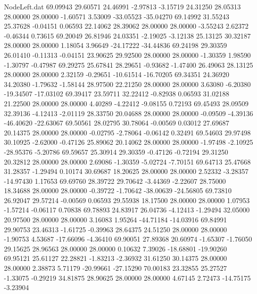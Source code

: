 \begin{filecontents}{NodeLeft.dat}
  69.09943   29.60571   24.46991    -2.97813   -3.15719   24.31250   28.05313   28.00000   28.00000   -1.60571    3.53009  -33.05523  -35.04270
  69.14992   31.55243   25.37628    -0.04151    0.06593   22.14062   28.39062   28.00000   28.00000   -3.55243    2.62372   -0.46344    0.73615
  69.20049   26.81946   24.03351    -2.19025   -3.12138   25.13125   30.32187   28.00000   28.00000    1.18054    3.96649  -24.17222  -34.44836
  69.24198   29.30359   26.01410    -0.11313   -0.04151   23.90625   29.92500   28.00000   28.00000   -1.30359    1.98590   -1.30797   -0.47987
  69.29275   25.67841   28.29651    -0.93682   -1.47400   26.49063   28.13125   28.00000   28.00000    2.32159   -0.29651  -10.61514  -16.70205
  69.34351   24.36920   34.20380    -1.79632   -1.58144   28.97500   22.21250   28.00000   28.00000    3.63080   -6.20380  -19.34507  -17.03102
  69.39417   23.59711   32.22412    -0.82938    0.06593   31.02188   21.22500   28.00000   28.00000    4.40289   -4.22412   -9.08155    0.72193
  69.45493   28.09509   32.39136    -4.12413   -2.01119   28.33750   20.04688   28.00000   28.00000   -0.09509   -4.39136  -46.40620  -22.63067
  69.50561   28.02795   30.78064    -0.00569    0.03012   27.69687   20.14375   28.00000   28.00000   -0.02795   -2.78064   -0.06142    0.32491
  69.54603   29.97498   30.10925    -2.62000   -0.47126   25.89062   20.14062   28.00000   28.00000   -1.97498   -2.10925  -28.95376   -5.20786
  69.59657   25.30914   29.30359    -0.47126   -0.72194   29.31250   20.32812   28.00000   28.00000    2.69086   -1.30359   -5.02724   -7.70151
  69.64713   25.47668   31.28357    -1.29494    0.10174   30.69687   18.20625   28.00000   28.00000    2.52332   -3.28357  -14.97430    1.17653
  69.69760   28.39722   29.70642    -3.44369   -2.22607   28.75000   18.34688   28.00000   28.00000   -0.39722   -1.70642  -38.00639  -24.56805
  69.73810   26.92047   29.57214    -0.00569    0.06593   29.55938   18.17500   28.00000   28.00000    1.07953   -1.57214   -0.06117    0.70838
  69.78893   24.83917   26.04736    -4.12413   -1.29494   32.05000   20.97500   28.00000   28.00000    3.16083    1.95264  -44.71184  -14.03916
  69.84991   29.90753   23.46313    -1.61725   -0.39963   28.64375   24.51250   28.00000   28.00000   -1.90753    4.53687  -17.66096   -4.36410
  69.90051   27.89368   20.60974    -1.65307   -1.76050   29.15625   28.96563   28.00000   28.00000    0.10632    7.39026  -18.68801  -19.90260
  69.95121   25.61127   22.28821    -1.83213   -2.36932   31.61250   30.14375   28.00000   28.00000    2.38873    5.71179  -20.99661  -27.15290
  70.00183   23.32855   25.27527    -1.33075   -0.29219   34.81875   28.90625   28.00000   28.00000    4.67145    2.72473  -14.75175   -3.23904

\end{filecontents}
